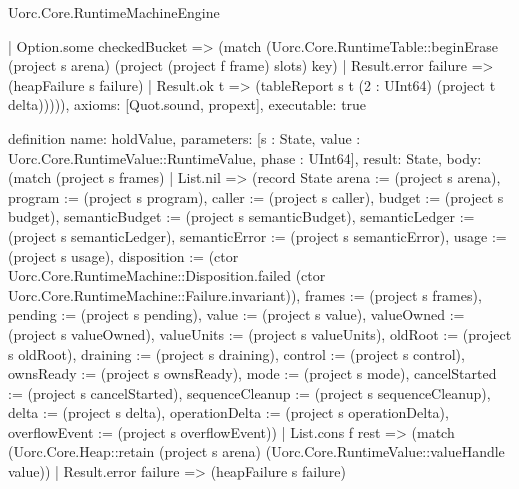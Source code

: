 \begin{lexlean}{Uorc.Core.RuntimeMachineEngine}
\begin{semanticmodule}
{      | Option.some checkedBucket => (match (Uorc.Core.RuntimeTable::beginErase (project s arena) (project (project f frame) slots) key)
        | Result.error failure => (heapFailure s failure)
        | Result.ok t => (tableReport s t (2 : UInt64) (project t delta))))),
  axioms: [Quot.sound, propext],
  executable: true
}

definition{
  name: holdValue,
  parameters: [s : State, value : Uorc.Core.RuntimeValue::RuntimeValue, phase : UInt64],
  result: State,
  body: (match (project s frames)
    | List.nil => (record State {arena := (project s arena), program := (project s program), caller := (project s caller), budget := (project s budget), semanticBudget := (project s semanticBudget), semanticLedger := (project s semanticLedger), semanticError := (project s semanticError), usage := (project s usage), disposition := (ctor Uorc.Core.RuntimeMachine::Disposition.failed (ctor Uorc.Core.RuntimeMachine::Failure.invariant)), frames := (project s frames), pending := (project s pending), value := (project s value), valueOwned := (project s valueOwned), valueUnits := (project s valueUnits), oldRoot := (project s oldRoot), draining := (project s draining), control := (project s control), ownsReady := (project s ownsReady), mode := (project s mode), cancelStarted := (project s cancelStarted), sequenceCleanup := (project s sequenceCleanup), delta := (project s delta), operationDelta := (project s operationDelta), overflowEvent := (project s overflowEvent)})
    | List.cons f rest => (match (Uorc.Core.Heap::retain (project s arena) (Uorc.Core.RuntimeValue::valueHandle value))
      | Result.error failure => (heapFailure s failure)
}
\end{semanticmodule}
\end{lexlean}
